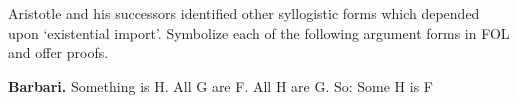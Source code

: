 \problempart
\label{pr.BarbaraEtc.proof2}
Aristotle and his successors identified other syllogistic forms which depended upon `existential import'. Symbolize each of the following argument forms in FOL and offer proofs.
\begin{compactlist}
\newpage	\item \textbf{Barbari.} Something is H. All G are F. All H are G. So: Some H is F
	\\
	

\end{compactlist}
